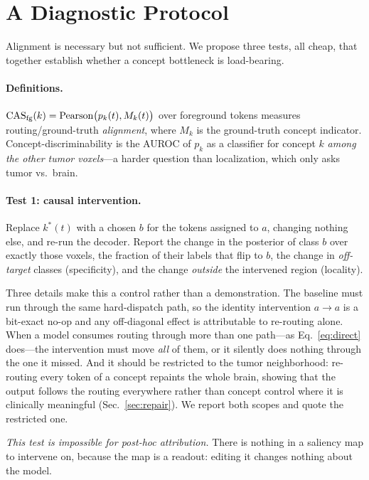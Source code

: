 \section{A Diagnostic Protocol}
\label{sec:protocol}

Alignment is necessary but not sufficient. We propose three tests, all cheap, that together
establish whether a concept bottleneck is load-bearing.

\paragraph{Definitions.}
$\mathrm{CAS}_{\mathrm{fg}}(k)=\mathrm{Pearson}\big(p_k(t),M_k(t)\big)$ over foreground tokens measures
routing/ground-truth \emph{alignment}, where $M_k$ is the ground-truth concept indicator.
Concept-discriminability is the AUROC of $p_k$ as a classifier for concept $k$ \emph{among the
other tumor voxels}---a harder question than localization, which only asks tumor vs.\ brain.

\paragraph{Test 1: causal intervention.}
Replace $k^\ast(t)$ with a chosen $b$ for the tokens assigned to $a$, changing nothing else, and
re-run the decoder. Report the change in the posterior of class $b$ over exactly those voxels, the
fraction of their labels that flip to $b$, the change in \emph{off-target} classes (specificity),
and the change \emph{outside} the intervened region (locality).

Three details make this a control rather than a demonstration. The baseline must run through the
same hard-dispatch path, so the identity intervention $a\!\to\!a$ is a bit-exact no-op and any
off-diagonal effect is attributable to re-routing alone. When a model consumes routing through
more than one path---as Eq.~\ref{eq:direct} does---the intervention must move \emph{all} of them,
or it silently does nothing through the one it missed. And it should be restricted to the tumor
neighborhood: re-routing every token of a concept repaints the whole brain, showing that the
output follows the routing everywhere rather than concept control where it is clinically
meaningful (Sec.~\ref{sec:repair}). We report both scopes and quote the restricted one.

\emph{This test is impossible for post-hoc attribution.} There is nothing in a saliency map to
intervene on, because the map is a readout: editing it changes nothing about the model.

